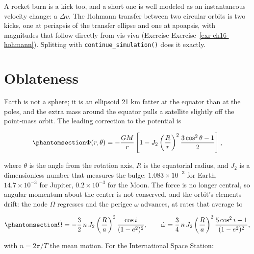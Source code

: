 \documentclass[
  10.5pt,
  letterpaper,
]{scrbook}
\theoremstyle{definition}
\theoremstyle{plain}
\theoremstyle{remark}
\begin{document}
A rocket burn is a kick too, and a short one is well modeled as an
instantaneous velocity change: a \(\Delta v\). The Hohmann transfer
between two circular orbits is two kicks, one at periapsis of the
transfer ellipse and one at apoapsis, with magnitudes that follow
directly from vis-viva (Exercise Exercise~\ref{exr-ch16-hohmann}).
Splitting with \texttt{continue\_simulation()} does it exactly.

\section{Oblateness}\label{oblateness}

Earth is not a sphere; it is an ellipsoid 21 km fatter at the equator
than at the poles, and the extra mass around the equator pulls a
satellite slightly off the point-mass orbit. The leading correction to
the potential is

\begin{equation}\protect\phantomsection\label{eq-j2}{
\Phi(r,\theta) = -\frac{GM}{r}\left[1 - J_2\left(\frac{R}{r}\right)^2\frac{3\cos^2\theta - 1}{2}\right],
}\end{equation}

where \(\theta\) is the angle from the rotation axis, \(R\) is the
equatorial radius, and \(J_2\) is a dimensionless number that measures
the bulge: \(1.083\times10^{-3}\) for Earth, \(14.7\times10^{-3}\) for
Jupiter, \(0.2\times10^{-3}\) for the Moon. The force is no longer
central, so angular momentum about the center is not conserved, and the
orbit's elements drift: the node \(\Omega\) regresses and the perigee
\(\omega\) advances, at rates that average to

\begin{equation}\protect\phantomsection\label{eq-j2-rates}{
\dot\Omega = -\frac{3}{2}\,n\,J_2\left(\frac{R}{a}\right)^2\frac{\cos i}{(1-e^2)^2}, \qquad
\dot\omega = \frac{3}{4}\,n\,J_2\left(\frac{R}{a}\right)^2\frac{5\cos^2 i - 1}{(1-e^2)^2},
}\end{equation}

with \(n = 2\pi/T\) the mean motion. For the International Space
Station:
\end{document}
